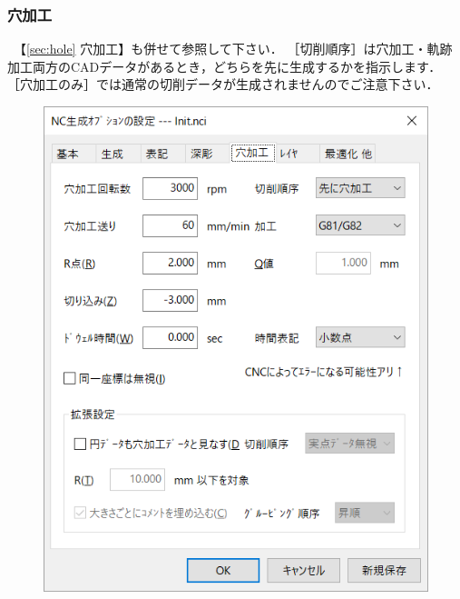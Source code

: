 \subsubsection{穴加工}
\begin{minipage}[t]{0.5\textwidth}
　【\ref{sec:hole} 穴加工】も併せて参照して下さい．
［切削順序］は穴加工・軌跡加工両方のCADデータがあるとき，どちらを先に生成するかを指示します．
［穴加工のみ］では通常の切削データが生成されませんのでご注意下さい．
\end{minipage}
\begin{minipage}[t]{0.5\textwidth}
\vspace*{-2zh}
\begin{figure}[H]
\centering
\includegraphics[scale=0.7]{No6/fig/init5.png}
\label{fig:init5.png}
\end{figure}
\end{minipage}

